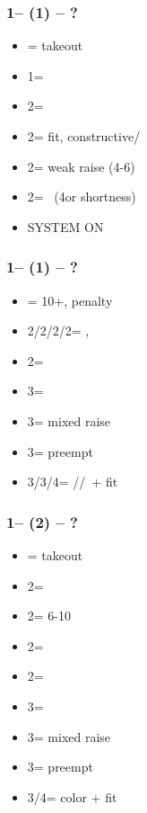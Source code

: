 \documentclass[12pt, a4paper]{report}
\begin{document}
{{{            \subsubsection*{1\hearts -- (1\spades) -- ?}
            \begin{itemize}
                \item \dbl = takeout
                \item 1\nt = \clubs
                \item 2\clubs = \diams
                \item 2\diams = fit, constructive/\gf
                \item 2\hearts = weak raise (4-6)
                \item 2\spades = \hearts\ \inv (4\hearts or shortness)
                \item \small{SYSTEM ON}
            \end{itemize}

            \subsubsection*{1\hearts -- (1\nt) -- ?}
            \begin{itemize}
                \item \dbl = 10+, penalty
                \item 2\clubs/2\diams/2\hearts/2\spades = \nat, \nf
                \item 2\nt = \minor
                \item 3\clubs = \hearts\ \inv
                \item 3\diams = mixed raise
                \item 3\hearts = preempt
                \item 3\spades/3\nt/4\clubs = \spades/\diams/\clubs\ + fit
            \end{itemize}

            \subsubsection*{1\hearts -- (2\clubs) -- ?}
            \begin{itemize}
                \item \dbl = takeout
                \item 2\diams = \fonce
                \item 2\hearts = 6-10
                \item 2\spades = \fonce
                \item 2\nt = \hearts\ \gf\
                \item 3\clubs = \hearts\ \inv\
                \item 3\diams = mixed raise
                \item 3\hearts = preempt
                \item 3\spades/4\diams = color + fit
            \end{itemize}

}}}
\end{document}
